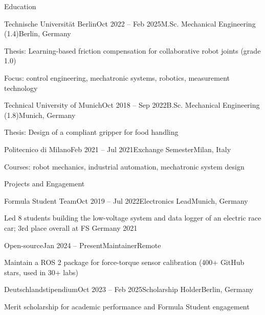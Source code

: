 \documentclass{resume} %
\begin{document}
\begin{rSection}{Education}

\begin{rSubsection}{Technische Universität Berlin}{Oct 2022 -- Feb 2025}{M.Sc. Mechanical Engineering (1.4)}{Berlin, Germany}
\item Thesis: Learning-based friction compensation for collaborative robot joints (grade 1.0)
\item Focus: control engineering, mechatronic systems, robotics, measurement technology
\end{rSubsection}

\begin{rSubsection}{Technical University of Munich}{Oct 2018 -- Sep 2022}{B.Sc. Mechanical Engineering (1.8)}{Munich, Germany}
\item Thesis: Design of a compliant gripper for food handling
\end{rSubsection}

\begin{rSubsection}{Politecnico di Milano}{Feb 2021 -- Jul 2021}{Exchange Semester}{Milan, Italy}
\item Courses: robot mechanics, industrial automation, mechatronic system design
\end{rSubsection}

\end{rSection}

\begin{rSection}{Projects and Engagement}

\begin{rSubsection}{Formula Student Team}{Oct 2019 -- Jul 2022}{Electronics Lead}{Munich, Germany}
\item Led 8 students building the low-voltage system and data logger of an electric race car; 3rd place overall at FS Germany 2021
\end{rSubsection}

\begin{rSubsection}{Open-source}{Jan 2024 -- Present}{Maintainer}{Remote}
\item Maintain a ROS 2 package for force-torque sensor calibration (400+ GitHub stars, used in 30+ labs)
\end{rSubsection}

\begin{rSubsection}{Deutschlandstipendium}{Oct 2023 -- Feb 2025}{Scholarship Holder}{Berlin, Germany}
\item Merit scholarship for academic performance and Formula Student engagement
\end{rSubsection}

\end{rSection}
\end{document}
